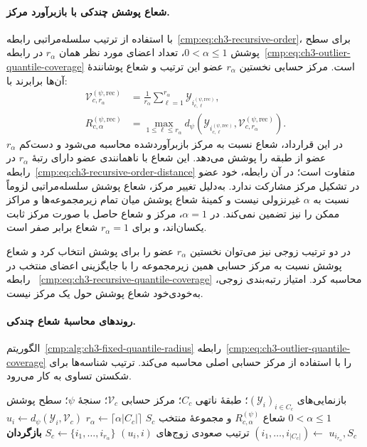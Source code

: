 \paragraph{شعاع پوشش چندکی با بازبرآورد مرکز.}
با استفاده از ترتیب سلسله‌مراتبی
رابطه~\eqref{cmp:eq:ch3-recursive-order}، برای سطح
پوشش $0<\alpha\le1$، تعداد اعضای مورد نظر همان $r_\alpha$ در
رابطه~\eqref{cmp:eq:ch3-outlier-quantile-coverage} است.
مرکز حسابی نخستین $r_\alpha$ عضو این ترتیب و شعاع
پوشانندهٔ آن‌ها برابرند با:
\begin{equation}\label{cmp:eq:ch3-recursive-quantile-coverage}
\boxed{\begin{aligned}
\mathcal V_{c,r_\alpha}^{(\psi,\mathrm{rec})}
&=\frac{1}{r_\alpha}\sum_{\ell=1}^{r_\alpha}
\mathscr Y_{i_{c,\ell}^{(\psi,\mathrm{rec})}},\\
R_{c,\alpha}^{(\psi,\mathrm{rec})}
&=\max_{1\le\ell\le r_\alpha}
d_\psi\left(
\mathscr Y_{i_{c,\ell}^{(\psi,\mathrm{rec})}},
\mathcal V_{c,r_\alpha}^{(\psi,\mathrm{rec})}
\right).
\end{aligned}}
\end{equation}
در این قرارداد، شعاع نسبت به مرکز بازبرآوردشده
محاسبه می‌شود و دست‌کم $r_\alpha$ عضو از طبقه را پوشش
می‌دهد. این شعاع با ناهمانندی عضو دارای رتبهٔ
$r_\alpha$ در رابطه~\eqref{cmp:eq:ch3-recursive-order-distance}
متفاوت است؛ در آن رابطه، خود عضو در تشکیل مرکز
مشارکت ندارد. به‌دلیل تغییر مرکز، شعاع پوشش
سلسله‌مراتبی لزوماً نسبت به $\alpha$ غیرنزولی
نیست و کمینهٔ شعاع پوشش میان تمام زیرمجموعه‌ها
و مراکز ممکن را نیز تضمین نمی‌کند. در $\alpha=1$،
مرکز و شعاع حاصل با صورت مرکز ثابت یکسان‌اند،
و برای $r_\alpha=1$ شعاع برابر صفر است.

در دو ترتیب زوجی نیز می‌توان نخستین $r_\alpha$
عضو را برای پوشش انتخاب کرد و شعاع پوشش نسبت
به مرکز حسابی همین زیرمجموعه را با جایگزینی
اعضای منتخب در رابطه~
\eqref{cmp:eq:ch3-recursive-quantile-coverage}
محاسبه کرد. امتیاز رتبه‌بندی زوجی، به‌خودی‌خود
شعاع پوشش حول یک مرکز نیست.

\paragraph{روندهای محاسبهٔ شعاع چندکی.}
الگوریتم~\ref{cmp:alg:ch3-fixed-quantile-radius}
رابطه~\eqref{cmp:eq:ch3-outlier-quantile-coverage}
را با استفاده از مرکز حسابی اصلی محاسبه می‌کند.
ترتیب شناسه‌ها برای شکستن تساوی به کار می‌رود.

\begin{algorithm}[!htbp]
\caption{زیرروال $\operatorname{FixedQuantileRadius}$: شعاع چندکی با مرکز ثابت}
\label{cmp:alg:ch3-fixed-quantile-radius}
\begin{algorithmic}[1]
\REQUIRE بازنمایی‌های $(\mathscr Y_i)_{i\in C_c}$؛ طبقهٔ ناتهی $C_c$؛ مرکز حسابی $\mathcal V_c$؛ سنجهٔ $\psi$؛ سطح پوشش $0<\alpha\le1$
\ENSURE شعاع $R_{c,\alpha}^{(\psi)}$ و مجموعهٔ منتخب $S_c$
\STATE $r_\alpha\gets\lceil\alpha|C_c|\rceil$
    \STATE $u_i\gets d_\psi(\mathscr Y_i,\mathcal V_c)$
\ENDFOR
\STATE $(i_1,\ldots,i_{|C_c|})\gets$ ترتیب صعودی زوج‌های $(u_i,i)$
\STATE $S_c\gets\{i_1,\ldots,i_{r_\alpha}\}$
\STATE \textbf{بازگردان} $u_{i_{r_\alpha}},S_c$
\end{algorithmic}
\end{algorithm}

